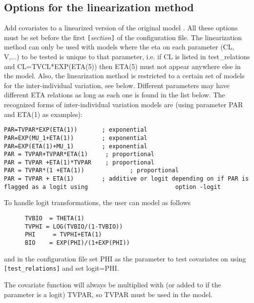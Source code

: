 \subsection{Options  for the linearization method}

Add covariates to a linearized version of the  original model \cite{Khandelwal}. All these options must be set before the first 
\verb|[|\emph{section}\verb|]|
of the configuration file. 
The linearization method can only be used with models where the eta on each parameter (CL, V,...) to be tested is unique to that parameter, i.e. if  CL is listed in test\_relations and CL=TVCL*EXP(ETA(5)) then ETA(5) must not appear anywhere else in the model. Also, the linearization method is restricted to a certain set of models for the inter-individual variation, see below. Different parameters may have different ETA relations as long as each one is found in the list below.
The recognized forms of inter-individual variation models are (using parameter PAR and ETA(1) as  examples):
\begin{verbatim}
PAR=TVPAR*EXP(ETA(1))	   	; exponential
PAR=EXP(MU_1+ETA(1))     	; exponential
PAR=EXP(ETA(1)+MU_1)    	; exponential
PAR = TVPAR+TVPAR*ETA(1)     ; proportional
PAR = TVPAR +ETA(1)*TVPAR    ; proportional
PAR = TVPAR*(1 +ETA(1))          	; proportional
PAR = TVPAR + ETA(1)   	 	; additive or logit depending on if PAR is flagged as a logit using 						option -logit
\end{verbatim}
To handle logit transformations, the user can model as follows
\begin{verbatim}
      TVBIO  = THETA(1)
      TVPHI = LOG(TVBIO/(1-TVBIO))
      PHI     = TVPHI+ETA(1)	
      BIO    = EXP(PHI)/(1+EXP(PHI))
\end{verbatim}
and in the configuration file set PHI as the parameter to test covariates on using 
\verb|[test_relations]| 
and set logit=PHI.

The covariate function will always be multiplied with (or added to if the parameter is a logit) TVPAR, so TVPAR must be used in the model.

